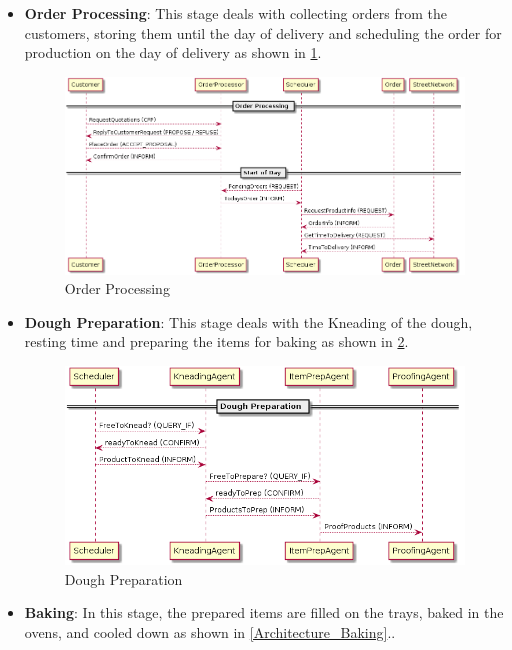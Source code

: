\documentclass[11pt, a4paper]{article}
\begin{document}
\begin{itemize}
	\item \textbf{Order Processing}: This stage deals with collecting orders from the customers, storing them until the day of delivery and scheduling the order for production on the day of delivery as shown in \ref{Architecture_OrderProcessing}.

\begin{figure}[h!]
	\centering
	\includegraphics[scale=0.4]{../Architecture/Architecture_OrderProcessing.png}
	\caption{Order Processing}
	\label{Architecture_OrderProcessing}
\end{figure}	
	
	\item \textbf{Dough Preparation}: This stage deals with the Kneading of the dough, resting time and preparing the items for baking  as shown in \ref{Architecture_DoughPreparation}.
	
\begin{figure}[h!]
	\centering
	\includegraphics[scale=0.5]{../Architecture/Architecture_DoughPreparation.png}
	\caption{Dough Preparation}
	\label{Architecture_DoughPreparation}
\end{figure}	
	
	\item \textbf{Baking}: In this stage, the prepared items are filled on the trays, baked in the ovens, and cooled down  as shown in \ref{Architecture_Baking}..


\end{itemize}
\end{document}
